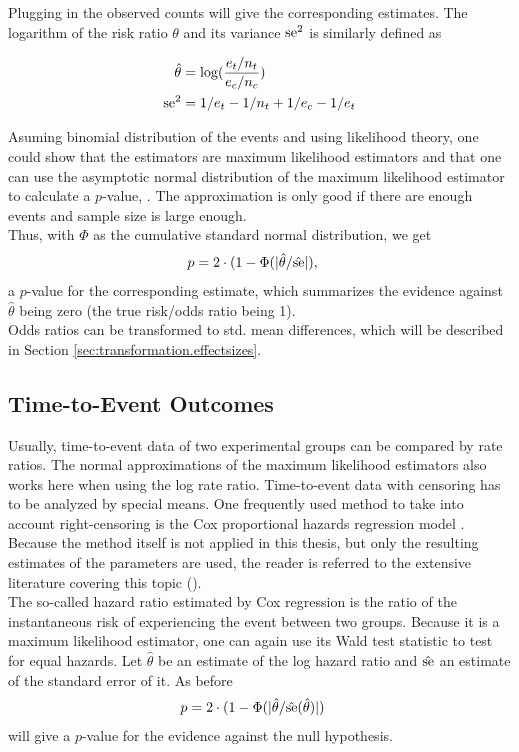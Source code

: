 \documentclass[11pt,a4paper,twoside]{book}\usepackage[]{graphicx}\usepackage[]{color}
\begin{document}
Plugging in the observed counts will give the corresponding estimates. The logarithm of the risk ratio $\theta$ and its variance $\operatorname{se}^2$ is similarly defined as

\begin{align}
\hat{\theta} &= \log(\frac{e_t/n_t}{e_c/n_c}) \label{eq:risk.ratio} \\
\operatorname{se}^2&= 1/e_t - 1/n_t + 1/e_c - 1/e_t \label{eq:risk.ratio.variance}
\end{align}

Asuming binomial distribution of the events and using likelihood theory, one could show that the estimators are maximum likelihood estimators and that one can use the asymptotic normal distribution of the maximum likelihood estimator to calculate a $p$\hspace{0.4mm}-value, \eg \cite[98]{held2014}. The approximation is only good if there are enough events and sample size is large enough.\\
Thus, with $\Phi$ as the cumulative standard normal distribution, we get
\begin{align}
p &= 2\cdot(1-\Phi(|\hat{\theta}/\hat{\operatorname{se}}|), \nonumber
\end{align}
a $p$\hspace{0.4mm}-value for the corresponding estimate, which summarizes the evidence against $\hat{\theta}$ being zero (\ie the true risk/odds ratio being 1). \\
Odds ratios can be transformed to std. mean differences, which will be described in Section \ref{sec:transformation.effectsizes}.

\subsection{Time-to-Event Outcomes}
Usually, time-to-event data of two experimental groups can be compared by rate ratios. The normal approximations of the maximum likelihood estimators also works here when using the log rate ratio.
Time-to-event data with censoring has to be analyzed by special means. One frequently used method to take into account right-censoring is the Cox proportional hazards regression model \citep{Cox}. Because the method itself is not applied in this thesis, but only the resulting estimates of the parameters are used, the reader is referred to the extensive literature covering this topic (\eg \citet{Surv}). \\
The so-called hazard ratio estimated by Cox regression is the ratio of the instantaneous risk of experiencing the event between two groups. Because it is a maximum likelihood estimator, one can again use its Wald test statistic to test for equal hazards. Let $\hat{\theta}$ be an estimate of the log hazard ratio and $\hat{\operatorname{se}}$ an estimate of the standard error of it. As before
\begin{align}
p &= 2\cdot(1-\Phi(|\hat{\theta}/\hat{\operatorname{se}}(\hat{\theta})|) \nonumber
\end{align}
will give a $p$\hspace{0.4mm}-value for the evidence against the null hypothesis.
\end{document}
